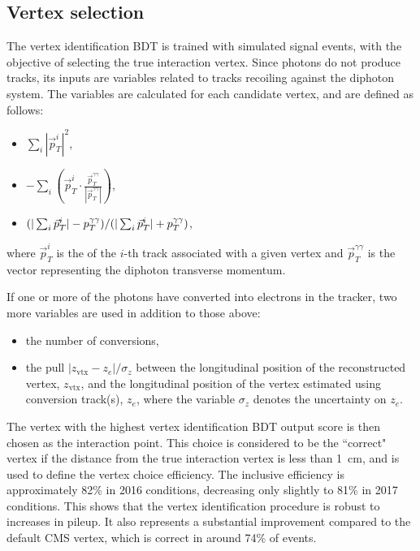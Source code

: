 \subsection{Vertex selection}

The vertex identification BDT is trained with simulated \Hgg signal events, 
with the objective of selecting the true interaction vertex.
Since photons do not produce tracks, its inputs are variables related to tracks
recoiling against the diphoton system.
The variables are calculated for each candidate vertex, and are defined as follows:
\begin{itemize}
        \item $\sum_{i}|\vec{p}_T^{i}|^{2}$,
        \item $\displaystyle -\sum_{i}(\vec{p}_T^{i}\cdot \frac{\vec{p}_T^{\gamma\gamma}}{|\vec{p}_T^{\gamma\gamma}|})$,
        \item $(|\sum_{i}\vec{p}_T^{i}| - p_T^{\gamma\gamma})/(|\sum_{i}\vec{p}_T^{i}| + p_T^{\gamma\gamma})$,
\end{itemize}
where $\vec{p}_T^{i}$ is the \pt of the $i$-th track
associated with a given vertex 
and $\vec{p}_T^{\gamma\gamma}$ is the vector representing the diphoton transverse momentum.

If one or more of the photons have converted into electrons in the tracker, 
two more variables are used in addition to those above:
\begin{itemize}
        \item the number of conversions,
        \item the pull $|z_{\text{vtx}} - z_e| /\sigma_{z}$ between the
                longitudinal position of the reconstructed vertex,
                $z_{\text{vtx}}$, and the longitudinal position of the
                vertex estimated using conversion track(s), $z_e$,
                where the variable $\sigma_{z}$ denotes the uncertainty 
                on $z_e$.
\end{itemize}

The vertex with the highest vertex identification BDT output score is then chosen 
as the \Hgg interaction point.
This choice is considered to be the ``correct" vertex if the distance from the true interaction vertex
is less than \SI{1}{cm}, and is used to define the vertex choice efficiency.
The inclusive efficiency is approximately 82\% in 2016 conditions, %
decreasing only slightly to 81\% in 2017 conditions.
This shows that the vertex identification procedure is robust to increases in pileup.
It also represents a substantial improvement compared to the default CMS vertex, %
which is correct in around 74\% of events.

